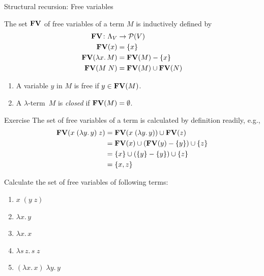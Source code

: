 \begin{frame}{Structural recursion: Free variables}
\begin{definition}
  The set $\mathbf{FV}$ of free variables of a term $M$ is inductively defined by
  \begin{align*}
    \mathbf{FV} \colon  \Lambda_V & \to \mathcal{P}(V) \\
    \mathbf{FV}(x) & = \{x\} \\
    \mathbf{FV}(\lambda x.\, M) & = \mathbf{FV}(M) - \{x\} \\
    \mathbf{FV}(M\;N) & = \mathbf{FV}(M) \cup \mathbf{FV}(N)
  \end{align*}
\end{definition}
\begin{definition}
  \begin{enumerate}
    \item A variable $y$ in $M$ is \alert{free} if $y \in \mathbf{FV}(M)$.
    \item A $\lambda$-term~$M$ is \alert{\emph{closed}} if $\mathbf{FV}(M) = \emptyset$. 
  \end{enumerate}
\end{definition}

\end{frame}

\begin{frame}{Exercise}
  The set of free variables of a term is calculated by definition readily, e.g., 
    \begin{align*}
      \mathbf{FV}(x\;(\lambda y.\, y)\;z) & = \mathbf{FV}(x\;(\lambda y.\, y)) \cup \mathbf{FV}(z) \\ 
                                  & = \mathbf{FV}(x) \cup (\mathbf{FV}(y) - \{y\}) \cup \{z\} \\
                                  & = \{x\} \cup (\{y\}-\{y\}) \cup \{z\} \\
                                  & = \{x, z\}
    \end{align*}

  Calculate the set of free variables of following terms:
  \begin{enumerate}
    \item $x\;(y\; z) $
    \item $\lambda x.\, y$
    \item $\lambda x.\, x$
    \item $\lambda s\,z.\, s \;z$
    \item $(\lambda x.\, x)\;\lambda y.\, y$
  \end{enumerate}
\end{frame}

